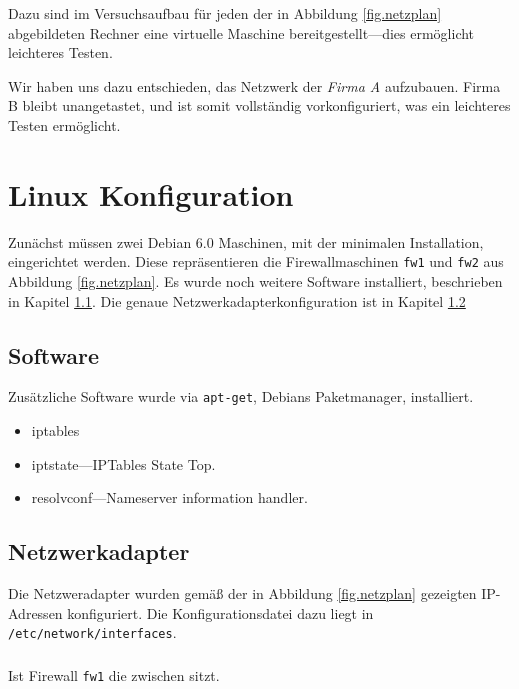 Dazu sind im Versuchsaufbau für jeden der in Abbildung 
\ref{fig.netzplan} abgebildeten Rechner
eine virtuelle Maschine bereitgestellt---dies ermöglicht leichteres
Testen.

Wir haben uns dazu entschieden, das Netzwerk der \emph{Firma A} aufzubauen.
Firma B bleibt unangetastet, und ist somit vollständig vorkonfiguriert,
was ein leichteres Testen ermöglicht.\cite{labor}


\section{Linux Konfiguration}

Zunächst müssen zwei Debian 6.0 Maschinen,
mit der minimalen Installation, eingerichtet werden.
Diese repräsentieren die Firewallmaschinen {\tt fw1} und {\tt fw2} aus
Abbildung \ref{fig.netzplan}.
Es wurde noch weitere Software installiert,
beschrieben in Kapitel \ref{sec.software}.
Die genaue Netzwerkadapterkonfiguration ist in Kapitel \ref{sec.netzwerk}

\subsection{Software}\label{sec.software}

Zusätzliche Software wurde via {\tt apt-get}, Debians Paketmanager,
installiert.

\begin{itemize}
    \item iptables
    \item iptstate---IPTables State Top.
    \item resolvconf---Nameserver information handler.
\end{itemize}


\subsection{Netzwerkadapter}\label{sec.netzwerk}

Die Netzweradapter wurden gemäß der in Abbildung \ref{fig.netzplan}
gezeigten IP-Adressen konfiguriert.
Die Konfigurationsdatei dazu liegt in {\tt /etc/network/interfaces}.

\subsubsection{\fwa}

Ist Firewall {\tt fw1} die zwischen \fwa sitzt.

